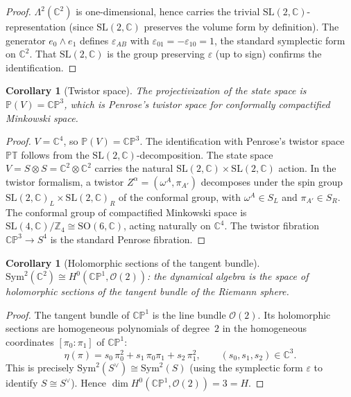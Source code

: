 \documentclass[11pt,a4paper]{article}
\newtheorem{corollary}[theorem]{Corollary}
\theoremstyle{definition}
\theoremstyle{remark}
\newcommand{\CP}{\mathbb{CP}}
\newcommand{\C}{\mathbb{C}}
\newcommand{\Z}{\mathbb{Z}}
\newcommand{\Sym}{\mathrm{Sym}}
\newcommand{\SL}{\mathrm{SL}}
\newcommand{\SO}{\mathrm{SO}}
\begin{document}
\begin{proof}
$\Lambda^2(\C^2)$ is one-dimensional, hence carries the trivial
$\SL(2,\C)$-representation (since $\SL(2,\C)$ preserves the volume form
by definition).
The generator $e_0\wedge e_1$ defines $\varepsilon_{AB}$ with
$\varepsilon_{01}=-\varepsilon_{10}=1$, the standard symplectic form on
$\C^2$.
That $\SL(2,\C)$ is the group preserving $\varepsilon$ (up to sign)
confirms the identification.
\end{proof}

\begin{corollary}[Twistor space]\label{cor:twistor}
The projectivization of the state space is $\mathbb{P}(V)=\CP^3$, which
is Penrose's twistor space for conformally compactified Minkowski space.
\end{corollary}

\begin{proof}
$V=\C^4$, so $\mathbb{P}(V)=\CP^3$.
The identification with Penrose's twistor space $\mathbb{PT}$ follows
from the $\SL(2,\C)$-decomposition.
The state space $V=S\otimes S=\C^2\otimes\C^2$ carries the natural
$\SL(2,\C)\times\SL(2,\C)$ action.
In the twistor formalism, a twistor $Z^\alpha=(\omega^A,\pi_{A'})$
decomposes under the spin group $\SL(2,\C)_L\times\SL(2,\C)_R$ of the
conformal group, with $\omega^A\in S_L$ and $\pi_{A'}\in S_R$.
The conformal group of compactified Minkowski space is
$\SL(4,\C)/\Z_4\cong\SO(6,\C)$, acting naturally on $\C^4$.
The twistor fibration $\CP^3\to S^4$ is the standard Penrose fibration.
\end{proof}

\begin{corollary}[Holomorphic sections of the tangent bundle]\label{cor:sections}
$\Sym^2(\C^2)\cong H^0(\CP^1,\mathcal{O}(2))$: the dynamical algebra
is the space of holomorphic sections of the tangent bundle of the
Riemann sphere.
\end{corollary}

\begin{proof}
The tangent bundle of $\CP^1$ is the line bundle $\mathcal{O}(2)$.
Its holomorphic sections are homogeneous polynomials of degree~$2$ in
the homogeneous coordinates $[\pi_0:\pi_1]$ of $\CP^1$:
\[
\eta(\pi) = s_0\,\pi_0^2 + s_1\,\pi_0\pi_1 + s_2\,\pi_1^2,
\qquad (s_0,s_1,s_2)\in\C^3.
\]
This is precisely $\Sym^2(S^\vee)\cong\Sym^2(S)$ (using the symplectic
form $\varepsilon$ to identify $S\cong S^\vee$).
Hence $\dim H^0(\CP^1,\mathcal{O}(2))=3=H$.
\end{proof}
\end{document}
